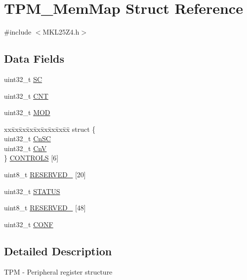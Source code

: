 \hypertarget{struct_t_p_m___mem_map}{}\section{T\+P\+M\+\_\+\+Mem\+Map Struct Reference}
\label{struct_t_p_m___mem_map}


{\ttfamily \#include $<$M\+K\+L25\+Z4.\+h$>$}

\subsection*{Data Fields}
\begin{DoxyCompactItemize}
\item 
uint32\+\_\+t \hyperlink{struct_t_p_m___mem_map_aad171b536497d5fa1a596d4d1c620175}{SC}
\item 
uint32\+\_\+t \hyperlink{struct_t_p_m___mem_map_a6fca6863f3eb037bb9f776358c88d2be}{C\+NT}
\item 
uint32\+\_\+t \hyperlink{struct_t_p_m___mem_map_a6a5f9ba7d911c8faacbe7b1f4f697c36}{M\+OD}
\item 
\begin{tabbing}
xx\=xx\=xx\=xx\=xx\=xx\=xx\=xx\=xx\=\kill
struct \{\\
\>uint32\_t \hyperlink{struct_t_p_m___mem_map_af69e08c8d2a99f6e1215f653135e5587}{CnSC}\\
\>uint32\_t \hyperlink{struct_t_p_m___mem_map_aba601a937c72cffd0da22ba83b8bafad}{CnV}\\
\} \hyperlink{struct_t_p_m___mem_map_a8ada41927e4f2854365d80506aaae779}{CONTROLS} \mbox{[}6\mbox{]}\\

\end{tabbing}\item 
uint8\+\_\+t \hyperlink{struct_t_p_m___mem_map_a5c429acbda13071dcc526ade1805a10a}{R\+E\+S\+E\+R\+V\+E\+D\+\_} \mbox{[}20\mbox{]}
\item 
uint32\+\_\+t \hyperlink{struct_t_p_m___mem_map_a3f9158fbf21c247984a9c169ebe43143}{S\+T\+A\+T\+US}
\item 
uint8\+\_\+t \hyperlink{struct_t_p_m___mem_map_ad8a834e9c0be4b8a1f57679868c10f2d}{R\+E\+S\+E\+R\+V\+E\+D\+\_} \mbox{[}48\mbox{]}
\item 
uint32\+\_\+t \hyperlink{struct_t_p_m___mem_map_a4e5e7db73f5f5cf620fd18197bebf134}{C\+O\+NF}
\end{DoxyCompactItemize}


\subsection{Detailed Description}
T\+PM -\/ Peripheral register structure 

